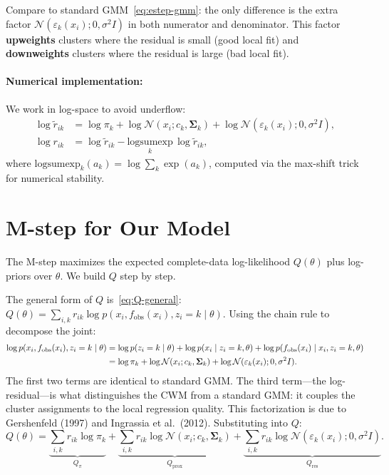 \documentclass[11pt]{article}
\theoremstyle{definition}
\theoremstyle{plain}
\theoremstyle{remark}
\newcommand{\Sv}{\boldsymbol{\Sigma}}
\begin{document}
Compare to standard GMM~\eqref{eq:estep-gmm}: the only difference is the extra factor $\mathcal{N}(\varepsilon_k(x_i);0,\sigma^2 I)$ in both numerator and denominator. This factor \textbf{upweights} clusters where the residual is small (good local fit) and \textbf{downweights} clusters where the residual is large (bad local fit).

\paragraph{Numerical implementation:} We work in log-space to avoid underflow:
\begin{align}
  \log\tilde{r}_{ik} &= \log\pi_k + \log\mathcal{N}(x_i;c_k,\Sv_k) + \log\mathcal{N}(\varepsilon_k(x_i);0,\sigma^2 I), \\
  \log r_{ik} &= \log\tilde{r}_{ik} - \underset{k}{\mathrm{logsumexp}}\,\log\tilde{r}_{ik},
\end{align}
where $\mathrm{logsumexp}_k(a_k)=\log\sum_k\exp(a_k)$, computed via the max-shift trick for numerical stability.

\section{M-step for Our Model}

The M-step maximizes the expected complete-data log-likelihood $Q(\theta)$ plus log-priors over $\theta$. We build $Q$ step by step.

The general form of $Q$ is~\eqref{eq:Q-general}: $Q(\theta)=\sum_{i,k}r_{ik}\log p(x_i,f_{\mathrm{obs}}(x_i),z_i=k\mid\theta)$. Using the chain rule to decompose the joint:
\begin{align}
  \log p(x_i,f_{\mathrm{obs}}(x_i),z_i=k\mid\theta) &= \log p(z_i=k\mid\theta) + \log p(x_i\mid z_i=k,\theta) + \log p(f_{\mathrm{obs}}(x_i)\mid x_i,z_i=k,\theta) \notag \\
  &= \log\pi_k + \log\mathcal{N}(x_i;c_k,\Sv_k) + \log\mathcal{N}(\varepsilon_k(x_i);0,\sigma^2 I).
\end{align}
The first two terms are identical to standard GMM. The third term---the log-residual---is what distinguishes the CWM from a standard GMM: it couples the cluster assignments to the local regression quality. This factorization is due to Gershenfeld (1997) and Ingrassia et al.\ (2012). Substituting into $Q$:
\begin{equation}
  Q(\theta) = \underbrace{\sum_{i,k} r_{ik}\log\pi_k}_{Q_\pi} + \underbrace{\sum_{i,k} r_{ik}\log\mathcal{N}(x_i;c_k,\Sv_k)}_{Q_{\text{prox}}} + \underbrace{\sum_{i,k} r_{ik}\log\mathcal{N}(\varepsilon_k(x_i);0,\sigma^2 I)}_{Q_{\text{res}}}.
  \label{eq:Q-ours}
\end{equation}
\end{document}
